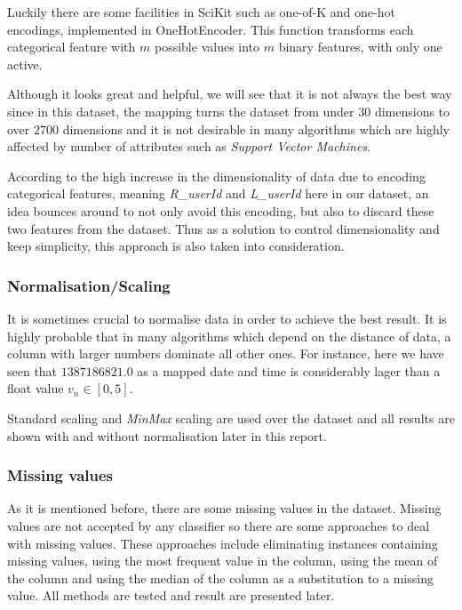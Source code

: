 Luckily there are some facilities in
SciKit such as one-of-K and one-hot encodings, implemented in OneHotEncoder. 
This function transforms each categorical
   feature with $m$ possible values into $m$ binary features, with only one
   active.

Although it looks great and helpful, we will see that it is not always the best
way since in this dataset, the mapping turns the dataset from under $30$
dimensions to over $2700$ dimensions and it is not desirable in many algorithms
which are highly affected by number of attributes such as {\it Support Vector
Machines}.

According to the high increase in the dimensionality of data due to encoding
categorical features, meaning {\it R\_userId} and {\it L\_userId} here in our
dataset, an idea bounces around to not only avoid this encoding, but also to
discard these two features from the dataset. Thus as a solution to control
dimensionality and keep simplicity, this approach is also taken into
consideration.

\subsubsection{Normalisation/Scaling}

It is sometimes crucial to normalise data in order to achieve the best result. It is
highly probable that in many algorithms which depend on the distance of data, a
column with larger numbers dominate all other ones. For instance, here we have
seen that $1387186821.0$ as a mapped date and time is considerably lager than a
float value $v_n \in [0,5]$.

Standard scaling and {\it MinMax} scaling are used over the dataset and all
results are shown with and without normalisation later in this report.

\subsubsection{Missing values}

As it is mentioned before, there are some missing values in the dataset. Missing
values are not accepted by any classifier so there are some approaches to deal
with missing values. These approaches include eliminating instances containing
missing values, using the most frequent value in the column, using the mean of
the column and using the median of the column as a substitution to a missing
value. All methods are tested and result are presented later.

